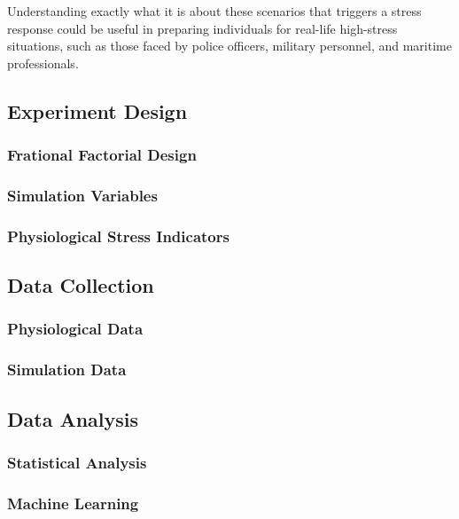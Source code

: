\documentclass[12pt]{article}
\begin{document}
Understanding exactly what it is about these scenarios that triggers a stress response could be useful in preparing individuals for real-life high-stress situations, such as those faced by police officers, military personnel, and maritime professionals.

\subsection{Experiment Design}

\subsubsection{Frational Factorial Design}

\subsubsection{Simulation Variables}

\subsubsection{Physiological Stress Indicators}

\subsection{Data Collection}

\subsubsection{Physiological Data}

\subsubsection{Simulation Data}

\subsection{Data Analysis}

\subsubsection{Statistical Analysis}

\subsubsection{Machine Learning}
\end{document}
